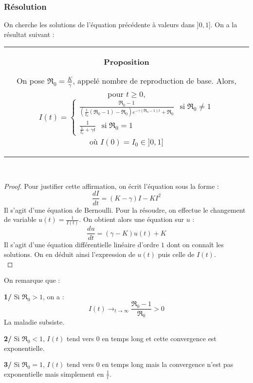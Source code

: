 \documentclass[a4paper,10.9pt]{article}
\begin{document}
\subsubsection{Résolution}
On cherche les solutions de l'équation précédente à valeurs dans $]0,1]$. On a la résultat suivant : \\

\begin{tabular}{|c}
\begin{minipage}{\textwidth}
\textbf{Proposition}


On pose $\mathfrak{R}_0=\frac{K}{\gamma}$, appelé nombre de reproduction de base. Alors, pour $t \geq 0$,
$$ I(t)= \left\{
\begin{array}{ll}
          \frac{\mathfrak{R}_0-1}{\left(\frac{1}{I_0}(\mathfrak{R}_0-1)-\mathfrak{R}_0 \right)e^{-\gamma(\mathfrak{R}_0-1)t}+\mathfrak{R}_0} \ \ \operatorname{si} \mathfrak{R}_0 \neq 1 \\
          \frac{1}{\frac{1}{I_0}+\gamma t} \ \ \operatorname{si} \mathfrak{R}_0=1
\end{array}
\right. $$
où $I(0)=I_0 \in ]0,1]$ 
\end{minipage}
\end{tabular} \\

\begin{proof}
Pour justifier cette affirmation, on écrit l'équation sous la forme :
$$\frac{dI}{dt}=(K-\gamma)I-KI^2$$
Il s'agit d'une équation de Bernoulli. Pour la résoudre, on effectue le changement de variable $u(t)=\frac{1}{I(t)}$. On obtient alors une équation sur $u$ :
$$\frac{du}{dt}=(\gamma-K)u(t)+K$$
Il s'agit d'une équation différentielle linéaire d'ordre $1$ dont on connaît les solutions. On en déduit ainsi l'expression de $u(t)$ puis celle de $I(t)$. \\
\end{proof}

On remarque que :

\textbf{1/} Si $\mathfrak{R}_0>1$, on a : 
$$I(t)\mathop{\longrightarrow}_{t \rightarrow \infty}\frac{\mathfrak{R}_0-1}{\mathfrak{R}_0}>0$$
La maladie subsiste.

\textbf{2/} Si $\mathfrak{R}_0<1$, $I(t)$ tend vers $0$ en temps long et cette convergence est exponentielle.

\textbf{3/} Si $\mathfrak{R}_0=1$, $I(t)$ tend vers $0$ en temps long mais la convergence n'est pas exponentielle mais simplement en $\frac{1}{t}$. \\
\end{document}
